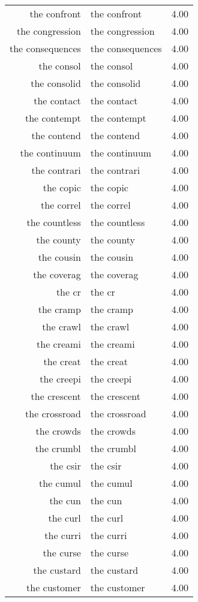 \begin{table}[ht]
\begin{tabular}{rlr}
  the confront & the confront & 4.00 \\ 
  the congression & the congression & 4.00 \\ 
  the consequences & the consequences & 4.00 \\ 
  the consol & the consol & 4.00 \\ 
  the consolid & the consolid & 4.00 \\ 
  the contact & the contact & 4.00 \\ 
  the contempt & the contempt & 4.00 \\ 
  the contend & the contend & 4.00 \\ 
  the continuum & the continuum & 4.00 \\ 
  the contrari & the contrari & 4.00 \\ 
  the copic & the copic & 4.00 \\ 
  the correl & the correl & 4.00 \\ 
  the countless & the countless & 4.00 \\ 
  the county & the county & 4.00 \\ 
  the cousin & the cousin & 4.00 \\ 
  the coverag & the coverag & 4.00 \\ 
  the cr & the cr & 4.00 \\ 
  the cramp & the cramp & 4.00 \\ 
  the crawl & the crawl & 4.00 \\ 
  the creami & the creami & 4.00 \\ 
  the creat & the creat & 4.00 \\ 
  the creepi & the creepi & 4.00 \\ 
  the crescent & the crescent & 4.00 \\ 
  the crossroad & the crossroad & 4.00 \\ 
  the crowds & the crowds & 4.00 \\ 
  the crumbl & the crumbl & 4.00 \\ 
  the csir & the csir & 4.00 \\ 
  the cumul & the cumul & 4.00 \\ 
  the cun & the cun & 4.00 \\ 
  the curl & the curl & 4.00 \\ 
  the curri & the curri & 4.00 \\ 
  the curse & the curse & 4.00 \\ 
  the custard & the custard & 4.00 \\ 
  the customer & the customer & 4.00 \\ 

\end{tabular}
\end{table}
